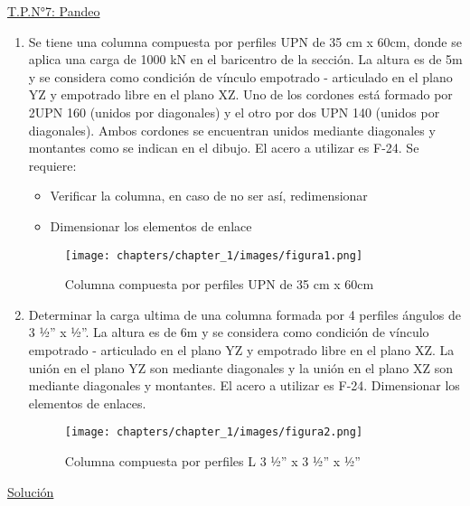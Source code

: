 \begin{center}
\underline{\Large{T.P.N°7: Pandeo}}
\end{center}

\begin{enumerate}
\item Se tiene una columna compuesta por perfiles UPN de 35 cm x 60cm, donde se aplica
una carga de 1000 kN en el baricentro de la sección. La altura es de 5m y se
considera como condición de vínculo empotrado - articulado en el plano YZ y
empotrado libre en el plano XZ. Uno de los cordones está formado por 2UPN 160
(unidos por diagonales) y el otro por dos UPN 140 (unidos por diagonales). Ambos
cordones se encuentran unidos mediante diagonales y montantes como se indican en
el dibujo. El acero a utilizar es F-24. Se requiere:
\begin{itemize}
\item Verificar la columna, en caso de no ser así, redimensionar
\item Dimensionar los elementos de enlace
\end{itemize}

\begin{figure}[H]
\begin{center}
     \texttt{[image: chapters/chapter\_1/images/figura1.png]}
\end{center}
\caption{Columna compuesta por perfiles UPN de 35 cm x 60cm}
\end{figure}
\item Determinar la carga ultima de una columna formada por 4 perfiles ángulos de 3 ½” x
½”. La altura es de 6m y se considera como condición de vínculo empotrado -
articulado en el plano YZ y empotrado libre en el plano XZ. La unión en el plano
YZ son mediante diagonales y la unión en el plano XZ son mediante diagonales y
montantes. El acero a utilizar es F-24. Dimensionar los elementos de enlaces.

\begin{figure}[H]
\begin{center}
     \texttt{[image: chapters/chapter\_1/images/figura2.png]}
\end{center}
\caption{Columna compuesta por perfiles L 3 ½” x 3 ½” x ½”}
\end{figure}
\end{enumerate}

\newpage

\begin{center}
\underline{\Large{Solución}}
\end{center}

